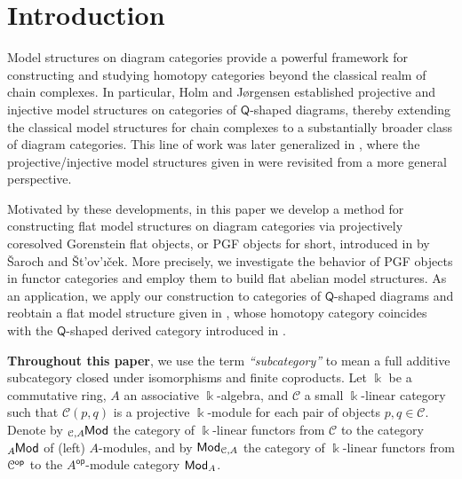 \documentclass{amsart}
\theoremstyle{bfupright head,slanted body}
\theoremstyle{bfupright head,upright body}
\theoremstyle{fixed bf head,slanted body}
\theoremstyle{fixed bf head,upright body}
\theoremstyle{numbered paragraph}
\numberwithin{equation}{res}
\newcommand{\C}{\mathcal{C}}
\newcommand{\Q}{\mathsf{Q}}
\newcommand{\kk}{\Bbbk}
\newcommand{\lMod}[1]{{}_{#1}\mspace{-1mu}{\sf{Mod}}}
\newcommand{\rMod}[1]{{\sf{Mod}}_{#1}}
\newcommand{\Aop}{A^{\mathsf{op}}}
\begin{document}
\maketitle
\vspace*{.3cm}
\vspace*{-.9cm}
\enlargethispage{.4cm}

\section*{Introduction}%
\noindent
Model structures on diagram categories provide a powerful framework for constructing and studying homotopy categories beyond the classical realm of chain complexes. In particular, Holm and J{\o}rgensen \cite{HJ21} established projective and injective model structures on categories of $\Q$-shaped diagrams, thereby extending the classical model structures for chain complexes to a substantially broader class of diagram categories. This line of work was later generalized in \cite{SV26}, where the projective/injective model structures given in \cite{HJ21} were revisited from a more general perspective.

Motivated by these developments, in this paper we develop a method for constructing flat model structures on diagram categories via projectively coresolved Gorenstein flat objects, or PGF objects for short, introduced in \cite{SS20} by \v{S}aroch and \v{S}t'ov'{\i}\v{c}ek. More precisely, we investigate the behavior of PGF objects in functor categories and employ them to build flat abelian model structures. As an application, we apply our construction to categories of $\Q$-shaped diagrams and reobtain a flat model structure given in \cite{DLLM}, whose homotopy category coincides with the $\Q$-shaped derived category introduced in \cite{HJ21}.

\textbf{Throughout this paper}, we use the term \emph{``subcategory''} to mean a full additive subcategory closed under isomorphisms and finite coproducts. Let $\kk$ be a commutative ring, $A$ an associative $\kk$-algebra, and $\C$ a small $\kk$-linear category such that $\C(p,q)$ is a projective $\kk$-module for each pair of objects $p,q\in\C$. Denote by $\lMod{\C,A}$ the category of $\kk$-linear functors from $\C$ to the category $\lMod{A}$ of (left) $A$-modules, and by $\rMod{\C,A}$ the category of $\kk$-linear functors from $\C^{\sf op}$ to the $\Aop$-module category $\rMod{A}$.
\end{document}
